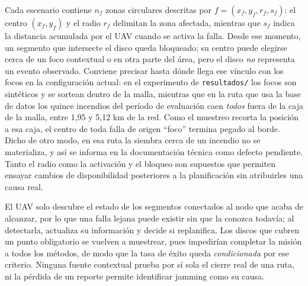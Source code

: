 \documentclass[journal,10pt]{IEEEtran}
\begin{document}
Cada escenario contiene $n_f$ zonas circulares descritas por
$f=(x_f,y_f,r_f,s_f)$: el centro $(x_f,y_f)$ y el radio $r_f$ delimitan
la zona afectada, mientras que $s_f$ indica la distancia acumulada por el
UAV cuando se activa la falla. Desde ese momento, un segmento que
intersecte el disco queda bloqueado; su centro puede elegirse cerca de un
foco contextual o en otra parte del área, pero el disco \emph{no}
representa un evento observado. Conviene precisar hasta dónde llega ese
vínculo con los focos en la configuración actual: en el experimento de
\texttt{resultados/} los focos son sintéticos y se sortean dentro de la
malla, mientras que en la ruta que usa la base de datos los quince
incendios del período de evaluación caen \emph{todos} fuera de la caja de
la malla, entre 1,95 y 5,12 km de la red. Como el muestreo recorta la
posición a esa caja, el centro de toda falla de origen ``foco'' termina
pegado al borde. Dicho de otro modo, en esa ruta la siembra cerca de un
incendio no se materializa, y así se informa en la documentación técnica
como defecto pendiente. Tanto el radio como la activación y el
bloqueo son supuestos que permiten ensayar cambios de disponibilidad
posteriores a la planificación sin atribuirles una causa real.

El UAV solo descubre el estado de los segmentos conectados al nodo que
acaba de alcanzar, por lo que una falla lejana puede existir sin que la
conozca todavía; al detectarla, actualiza su información y decide si
replanifica. Los discos que cubren un punto obligatorio se vuelven a
muestrear, pues impedirían completar la misión a todos los métodos, de
modo que la tasa de éxito queda \emph{condicionada} por ese criterio.
Ninguna fuente contextual prueba por sí sola el cierre real de una ruta,
ni la pérdida de un reporte permite identificar jamming como su causa.
\end{document}
